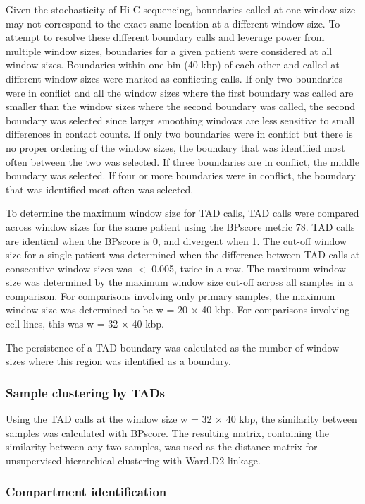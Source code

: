 Given the stochasticity of Hi-C sequencing, boundaries called at one window size may not correspond to the exact same location at a different window size.
To attempt to resolve these different boundary calls and leverage power from multiple window sizes, boundaries for a given patient were considered at all window sizes.
Boundaries within one bin (40 kbp) of each other and called at different window sizes were marked as conflicting calls.
If only two boundaries were in conflict and all the window sizes where the first boundary was called are smaller than the window sizes where the second boundary was called, the second boundary was selected since larger smoothing windows are less sensitive to small differences in contact counts.
If only two boundaries were in conflict but there is no proper ordering of the window sizes, the boundary that was identified most often between the two was selected.
If three boundaries are in conflict, the middle boundary was selected.
If four or more boundaries were in conflict, the boundary that was identified most often was selected.

To determine the maximum window size for TAD calls, TAD calls were compared across window sizes for the same patient using the BPscore metric 78.
TAD calls are identical when the BPscore is 0, and divergent when 1.
The cut-off window size for a single patient was determined when the difference between TAD calls at consecutive window sizes was $<$ 0.005, twice in a row.
The maximum window size was determined by the maximum window size cut-off across all samples in a comparison.
For comparisons involving only primary samples, the maximum window size was determined to be w = 20 $\times$ 40 kbp.
For comparisons involving cell lines, this was w = 32 $\times$ 40 kbp.

The persistence of a TAD boundary was calculated as the number of window sizes where this region was identified as a boundary.

\subsubsection{Sample clustering by TADs}

Using the TAD calls at the window size w = 32 $\times$ 40 kbp, the similarity between samples was calculated with BPscore.
The resulting matrix, containing the similarity between any two samples, was used as the distance matrix for unsupervised hierarchical clustering with Ward.D2 linkage.

\subsubsection{Compartment identification}

